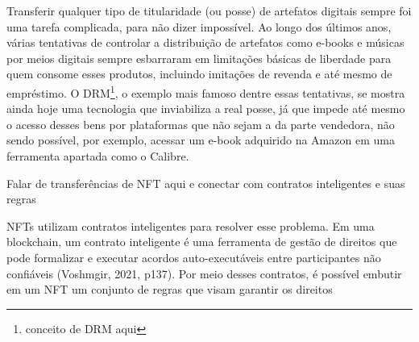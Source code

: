 Transferir qualquer tipo de titularidade (ou posse) de artefatos digitais sempre foi uma tarefa complicada, para não dizer impossível. Ao longo dos últimos anos, várias tentativas de controlar a distribuição de artefatos como e-books e músicas por meios digitais sempre esbarraram em limitações básicas de liberdade para quem consome esses produtos, incluindo imitações de revenda e até mesmo de empréstimo. O DRM\footnote{conceito de DRM aqui}, o exemplo mais famoso dentre essas tentativas, se mostra ainda hoje uma tecnologia que inviabiliza a real posse, já que impede até mesmo o acesso desses bens por plataformas que não sejam a da parte vendedora, não sendo possível, por exemplo, acessar um e-book adquirido na Amazon em uma ferramenta apartada como o Calibre.

Falar de transferências de NFT aqui e conectar com contratos inteligentes e suas regras

NFTs utilizam contratos inteligentes para resolver esse problema. Em uma blockchain, um contrato inteligente é uma ferramenta de gestão de direitos que pode formalizar e executar acordos auto-executáveis entre participantes não confiáveis (Voshmgir, 2021, p137). Por meio desses contratos, é possível embutir em um NFT um conjunto de regras que visam garantir os direitos 













